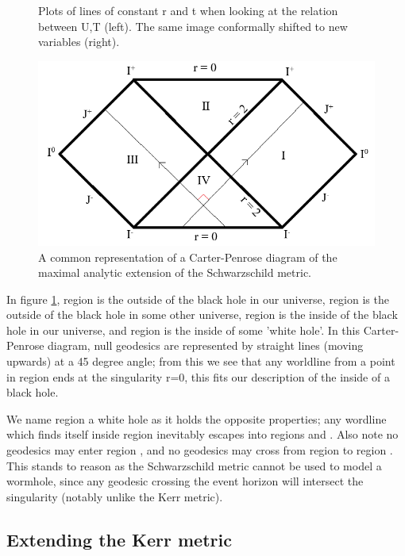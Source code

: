 \documentclass[oneside,openright,frontopenright, singlespacing]{dmathesis}
\begin{document}
\begin{figure}[!ht]
\begin{minipage}{0.5\textwidth}
	\end{minipage}
	\caption{Plots of lines of constant r and t when looking at the relation between U,T (left). The same image conformally shifted to new variables (right).}
	\label{fig:Figure6.1}
	\includegraphics[width=0.6\linewidth]{img/carter-penrose3}
	\caption{A common representation of a Carter-Penrose diagram of the maximal analytic extension of the Schwarzschild metric.}
	\label{fig:Figure6.2}
\end{figure}

\vspace{1em}
	In figure \ref{fig:Figure6.2}, region  is the outside of the black hole in our universe, region  is the outside of the black hole in some other universe, region  is the inside of the black hole in our universe, and region  is the inside of some 'white hole'. In this Carter-Penrose diagram, null geodesics are represented by straight lines (moving upwards) at a 45 degree angle; from this we see that any worldline from a point in region  ends at the singularity r=0, this fits our description of the inside of a black hole.

\vspace{1em}
	We name region  a white hole as it holds the opposite properties; any wordline which finds itself inside region  inevitably escapes into regions  and . Also note no geodesics may enter region , and no geodesics may cross from region  to region . This stands to reason as the Schwarzschild metric cannot be used to model a wormhole, since any geodesic crossing the event horizon will intersect the singularity (notably unlike the Kerr metric).

\subsection{Extending the Kerr metric}\label{subsec:Section6.1.2}
\end{document}
